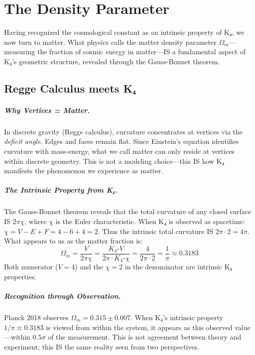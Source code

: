 \documentclass[11pt,a4paper]{book}
\begin{document}

\chapter{The Density Parameter}
\label{chap:matter-density-geometry}

Having recognized the cosmological constant as an intrinsic property of K₄, we now turn to matter. What physics calls the matter density parameter $\Omega_m$—measuring the fraction of cosmic energy in matter—IS a fundamental aspect of K₄'s geometric structure, revealed through the Gauss-Bonnet theorem.

\section{Regge Calculus meets K₄}

\paragraph{Why Vertices = Matter.}
In discrete gravity (Regge calculus), curvature concentrates at vertices via the \emph{deficit angle}. Edges and faces remain flat. Since Einstein's equation identifies curvature with mass-energy, what we call matter can only reside at vertices within discrete geometry. This is not a modeling choice—this IS how K₄ manifests the phenomenon we experience as matter.

\paragraph{The Intrinsic Property from K₄.}
The Gauss-Bonnet theorem reveals that the total curvature of any closed surface IS $2\pi\chi$, where $\chi$ is the Euler characteristic. When K₄ is observed as spacetime: $\chi = V - E + F = 4 - 6 + 4 = 2$. Thus the intrinsic total curvature IS $2\pi \cdot 2 = 4\pi$. What appears to us as the matter fraction is:
\[
\Omega_m = \frac{V}{2\pi\chi} = \frac{K_4\text{-}V}{2\pi \cdot K_4\text{-}\chi} = \frac{4}{2\pi \cdot 2} = \frac{1}{\pi} \approx 0.3183
\]
Both numerator ($V=4$) and the $\chi=2$ in the denominator are intrinsic K₄ properties.

\paragraph{Recognition through Observation.}
Planck 2018 observes $\Omega_m = 0.315 \pm 0.007$. When K₄'s intrinsic property $1/\pi \approx 0.3183$ is viewed from within the system, it appears as this observed value—within $0.5\sigma$ of the measurement. This is not agreement between theory and experiment; this IS the same reality seen from two perspectives.
\end{document}
